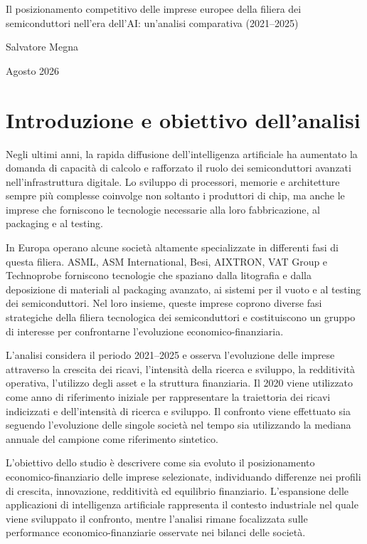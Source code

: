 \documentclass[11pt,a4paper]{article}
\begin{document}
\begin{center}
{\LARGE Il posizionamento competitivo delle imprese europee della filiera dei semiconduttori nell'era dell'AI: un'analisi comparativa (2021--2025)}

\vspace{0.7cm}
{\large Salvatore Megna}

\vspace{0.25cm}
Agosto 2026
\end{center}

\vspace{0.5cm}

\section{Introduzione e obiettivo dell'analisi}

Negli ultimi anni, la rapida diffusione dell'intelligenza artificiale ha aumentato la domanda di capacità di calcolo e rafforzato il ruolo dei semiconduttori avanzati nell'infrastruttura digitale. Lo sviluppo di processori, memorie e architetture sempre più complesse coinvolge non soltanto i produttori di chip, ma anche le imprese che forniscono le tecnologie necessarie alla loro fabbricazione, al packaging e al testing.

In Europa operano alcune società altamente specializzate in differenti fasi di questa filiera. ASML, ASM International, Besi, AIXTRON, VAT Group e Technoprobe forniscono tecnologie che spaziano dalla litografia e dalla deposizione di materiali al packaging avanzato, ai sistemi per il vuoto e al testing dei semiconduttori. Nel loro insieme, queste imprese coprono diverse fasi strategiche della filiera tecnologica dei semiconduttori e costituiscono un gruppo di interesse per confrontarne l'evoluzione economico-finanziaria.

L'analisi considera il periodo 2021--2025 e osserva l'evoluzione delle imprese attraverso la crescita dei ricavi, l'intensità della ricerca e sviluppo, la redditività operativa, l'utilizzo degli asset e la struttura finanziaria. Il 2020 viene utilizzato come anno di riferimento iniziale per rappresentare la traiettoria dei ricavi indicizzati e dell'intensità di ricerca e sviluppo. Il confronto viene effettuato sia seguendo l'evoluzione delle singole società nel tempo sia utilizzando la mediana annuale del campione come riferimento sintetico.

L'obiettivo dello studio è descrivere come sia evoluto il posizionamento economico-finanziario delle imprese selezionate, individuando differenze nei profili di crescita, innovazione, redditività ed equilibrio finanziario. L'espansione delle applicazioni di intelligenza artificiale rappresenta il contesto industriale nel quale viene sviluppato il confronto, mentre l'analisi rimane focalizzata sulle performance economico-finanziarie osservate nei bilanci delle società.
\end{document}
